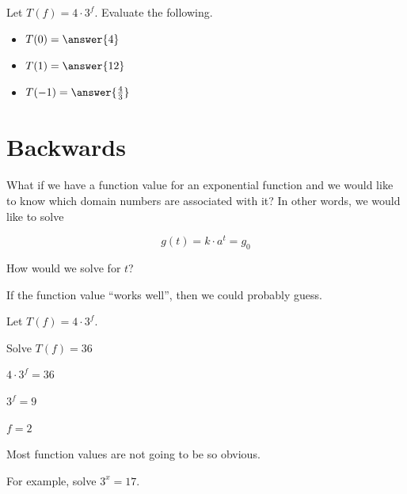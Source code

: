 \documentclass{ximera}
\begin{document}
\begin{example}

Let $T(f) = 4 \cdot 3^f$.  Evaluate the following.

\begin{itemize}
\item $T(0) = \answer{4}$ 
\item $T(1) = \answer{12}$
\item $T(-1) = \answer{\frac{4}{3}}$
\end{itemize}
\end{example}























\section{Backwards}

What if we have a function value for an exponential function and we would like to know which domain numbers are associated with it?  In other words, we would like to solve


\[    g(t) = k \cdot a^t  =   g_0    \]


How would we solve for $t$?






\begin{example} If the function value ``works well'', then we could probably guess.

Let $T(f) = 4 \cdot 3^f$.  


Solve $T(f) = 36$

$4 \cdot 3^f = 36$

$3^f = 9$

$f = 2$

\end{example}









Most function values are not going to be so obvious. 


For example, solve $ 3^x = 17$.
\end{document}
